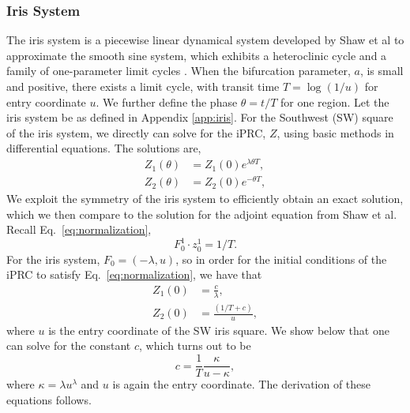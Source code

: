 \documentclass[a4paper,12pt]{article}
\begin{document}
\subsubsection{Iris System}
The iris system is a piecewise linear dynamical system developed by Shaw et al to approximate the smooth sine system, which exhibits a heteroclinic cycle and a family of one-parameter limit cycles \cite{ShawParkChielThomas2012SIADS}.  When the bifurcation parameter, $a$, is small and positive, there exists a limit cycle, with transit time $T = \log(1/u)$ for entry coordinate $u$. We further define the phase $\theta = t/T$ for one region.  Let the iris system be as defined in Appendix \ref{app:iris}.  For the Southwest (SW) square of the iris system, we directly can solve for the iPRC, $Z$, using basic methods in differential equations.  The solutions are,
\begin{equation}
\begin{split}
 Z_1(\theta) &= Z_1(0) e^{\lambda \theta T},\\
 Z_2(\theta) &= Z_2(0) e^{-\theta T},
\end{split}
\label{eq:zi}\end{equation}
We exploit the symmetry of the iris system to efficiently obtain an exact solution, which we then compare to the solution for the adjoint equation from Shaw et al.  Recall Eq.~\eqref{eq:normalization},
\begin{equation}
 F_0^1 \cdot z_0^1 = 1/T.
\end{equation}
For the iris system, $F_0 = (-\lambda, u)$, so in order for the initial conditions of the iPRC to satisfy Eq.~\eqref{eq:normalization}, we have that
\begin{equation}
\begin{split}
 Z_1(0) &= \frac{c}{\lambda},\\
 Z_2(0) &= \frac{(1/T+c)}{u},
 \end{split}
\label{eq:z0}\end{equation}
where $u$ is the entry coordinate of the SW iris square.  We show below that one can solve for the constant $c$, which turns out to be
\begin{equation}
 c = \frac{1}{T}\frac{\kappa}{u-\kappa},
\label{eq:c}\end{equation}
where $\kappa = \lambda u^{\lambda}$ and $u$ is again the entry coordinate. The derivation of these equations follows.
\end{document}
